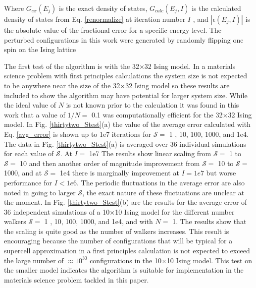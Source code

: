 \documentclass[aps,pre,reprint,superscriptaddress,showkeys]{revtex4-1}
\begin{document}
Where $G_{ex}(E_j)$ is the exact density of states, $G_{calc}(E_j,I)$ is the calculated density of states from Eq. \ref{renormalize}  at iteration number $I$ , and $|\epsilon(E_j,I)|$ is the absolute value of the fractional error for a specific energy level.  The perturbed configurations in this work were generated by randomly flipping one spin on the Ising lattice

The first test of the algorithm is with the 32$\times$32 Ising model. In a materials science problem with first principles calculations the system size is not expected to be anywhere near the size of the  32$\times$32 Ising model so these results are included to show the algorithm may have potential for larger system size. While the ideal value of $N$ is not known prior to the calculation it was found in this work that a value of $1/N=$ 0.1 was computationally efficient for the 32$\times$32 Ising model. In Fig. \ref{thirtytwo_Stest}(a) the value of the average error calculated with Eq. \ref{avg_error} is shown up to 1e7 iterations for $\mathcal{S}=$ 1 , 10, 100, 1000, and 1e4. The data in Fig. \ref{thirtytwo_Stest}(a) is averaged over 36 individual simulations for each value of $\mathcal{S}$. At $I=$ 1e7 The results show linear scaling from $\mathcal{S}=$ 1 to $\mathcal{S}=$ 10 and then another order of magnitude improvement from $\mathcal{S}=$ 10 to $\mathcal{S}=$ 1000, and at $\mathcal{S}=$ 1e4 there is marginally improvement at $I=1e7$ but worse performance for $I<1e6$.  The periodic fluctuations in the average error are also noted in going to larger $\mathcal{S}$, the exact nature of these fluctuations are unclear at the moment. In Fig. \ref{thirtytwo_Stest}(b) are  the results for the average error of 36 independent simulations of a 10$\times$10 Ising model for the different number walkers $\mathcal{S}=$ 1 , 10, 100, 1000, and 1e4, and  with $N=$ 1. The results show that the scaling is quite good as the number of walkers increases. This result is encouraging because the number of configurations that will be typical for a supercell approximation in a first principles calculation is not expected to exceed the large number of $\approx 10^{30}$ configurations in the 10$\times$10 Ising model.  This test on the smaller model indicates the algorithm  is suitable for implementation in the materials science problem tackled in this paper. 
\end{document}
